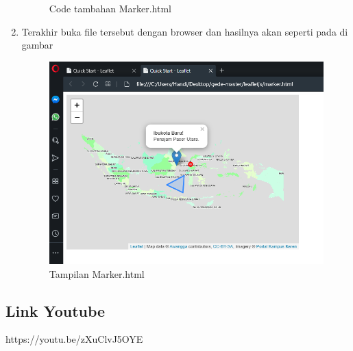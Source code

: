 \begin{enumerate}
\begin{figure}[H]
		\centering
		\caption{Code tambahan Marker.html}
	\end{figure}
    \item Terakhir buka file tersebut dengan browser dan hasilnya akan seperti pada di gambar
    \hfill\break
    \begin{figure}[H]
		\includegraphics[width=12cm]{figures/Tugas5/1174080/7.png}
		\centering
		\caption{Tampilan Marker.html}
	\end{figure}
\end{enumerate}
\subsection{Link Youtube}
https://youtu.be/zXuClvJ5OYE